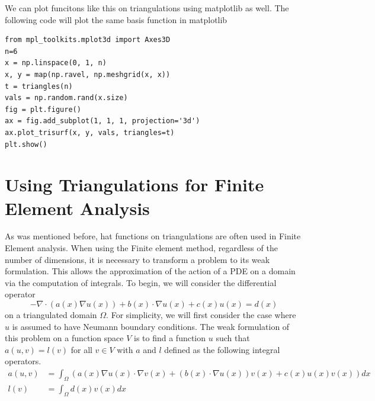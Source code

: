 We can plot funcitons like this on triangulations using matplotlib as well.
The following code will plot the same basis function in matplotlib
\begin{lstlisting}
from mpl_toolkits.mplot3d import Axes3D
n=6
x = np.linspace(0, 1, n)
x, y = map(np.ravel, np.meshgrid(x, x))
t = triangles(n)
vals = np.random.rand(x.size)
fig = plt.figure()
ax = fig.add_subplot(1, 1, 1, projection='3d')
ax.plot_trisurf(x, y, vals, triangles=t)
plt.show()
\end{lstlisting}

\section*{Using Triangulations for Finite Element Analysis}

As was mentioned before, hat functions on triangulations are often used in Finite Element analysis.
When using the Finite element method, regardless of the number of dimensions, it is necessary to transform a problem to its weak formulation.
This allows the approximation of the action of a PDE on a domain via the computation of integrals.
To begin, we will consider the differential operator
\[-\nabla \cdot \left(a\left(x\right) \nabla u\left(x\right)\right) + b\left(x\right) \cdot \nabla u\left(x\right) + c\left(x\right) u\left(x\right) = d\left(x\right)\]
on a triangulated domain $\Omega$.
For simplicity, we will first consider the case where $u$ is assumed to have Neumann boundary conditions.
The weak formulation of this problem on a function space $V$ is to find a function $u$ such that $a\left(u, v\right) = l\left(v\right)$ for all $v \in V$ with $a$ and $l$ defined as the following integral operators.
\begin{align*}
a\left(u, v\right) &= \int_\Omega \left( a\left(x\right) \nabla u\left(x\right) \cdot \nabla v\left(x\right) + \left(b\left(x\right) \cdot \nabla u\left(x\right)\right) v\left(x\right) + c\left(x\right) u\left(x\right) v\left(x\right) \right) dx\\
l\left(v\right) &= \int_\Omega d\left(x\right) v\left(x\right) dx
\end{align*}

